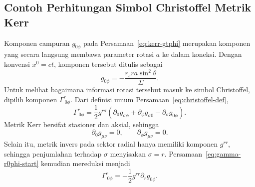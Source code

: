 \subsection{Contoh Perhitungan Simbol Christoffel Metrik Kerr}
\label{subsec:christoffel-kerr-contoh}

Komponen campuran $g_{0\phi}$ pada Persamaan~\eqref{eq:kerr-gtphi}
merupakan komponen yang secara langsung membawa parameter rotasi $a$ ke
dalam koneksi. Dengan konvensi $x^0=ct$, komponen tersebut ditulis sebagai
\begin{equation}
    g_{0\phi}
    =-\frac{r_sra\sin^2\!\theta}{\Sigma}.
    \label{eq:kerr-g0phi}
\end{equation}
Untuk melihat bagaimana informasi rotasi tersebut masuk ke simbol
Christoffel, dipilih komponen $\Gamma^r_{\ 0\phi}$. Dari definisi umum
Persamaan~\eqref{eq:christoffel-def},
\begin{equation}
    \Gamma^r_{\ 0\phi}
    =\frac{1}{2}g^{r\sigma}
    \left(
        \partial_0 g_{\sigma\phi}
        +\partial_\phi g_{\sigma0}
        -\partial_\sigma g_{0\phi}
    \right).
    \label{eq:gamma-r0phi-start}
\end{equation}
Metrik Kerr bersifat stasioner dan aksial, sehingga
\begin{equation}
    \partial_0 g_{\mu\nu}=0,
    \qquad
    \partial_\phi g_{\mu\nu}=0.
\end{equation}
Selain itu, metrik invers pada sektor radial hanya memiliki komponen
$g^{rr}$, sehingga penjumlahan terhadap $\sigma$ menyisakan
$\sigma=r$. Persamaan~\eqref{eq:gamma-r0phi-start} kemudian mereduksi
menjadi
\begin{equation}
    \Gamma^r_{\ 0\phi}
    =-\frac{1}{2}g^{rr}\partial_r g_{0\phi}.
    \label{eq:gamma-r0phi-reduced}
\end{equation}

